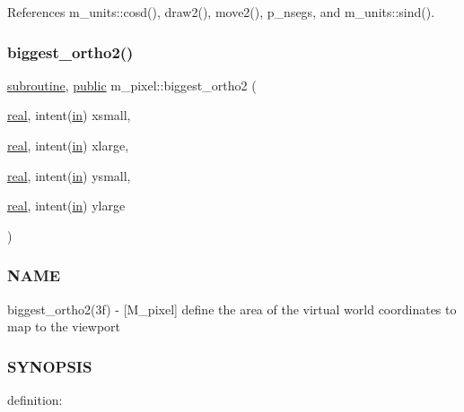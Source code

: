 References m\+\_\+units\+::cosd(), draw2(), move2(), p\+\_\+nsegs, and m\+\_\+units\+::sind().

\mbox{\label{namespacem__pixel_accc2eab6fbc7b453afa34e1e2c834223}} 
\subsubsection{\texorpdfstring{biggest\+\_\+ortho2()}{biggest\_ortho2()}}
{\footnotesize\ttfamily \hyperlink{M__stopwatch_83_8txt_acfbcff50169d691ff02d4a123ed70482}{subroutine}, \hyperlink{M__stopwatch_83_8txt_a2f74811300c361e53b430611a7d1769f}{public} m\+\_\+pixel\+::biggest\+\_\+ortho2 (\begin{DoxyParamCaption}\item[{\hyperlink{read__watch_83_8txt_abdb62bde002f38ef75f810d3a905a823}{real}, intent(\hyperlink{M__journal_83_8txt_afce72651d1eed785a2132bee863b2f38}{in})}]{xsmall,  }\item[{\hyperlink{read__watch_83_8txt_abdb62bde002f38ef75f810d3a905a823}{real}, intent(\hyperlink{M__journal_83_8txt_afce72651d1eed785a2132bee863b2f38}{in})}]{xlarge,  }\item[{\hyperlink{read__watch_83_8txt_abdb62bde002f38ef75f810d3a905a823}{real}, intent(\hyperlink{M__journal_83_8txt_afce72651d1eed785a2132bee863b2f38}{in})}]{ysmall,  }\item[{\hyperlink{read__watch_83_8txt_abdb62bde002f38ef75f810d3a905a823}{real}, intent(\hyperlink{M__journal_83_8txt_afce72651d1eed785a2132bee863b2f38}{in})}]{ylarge }\end{DoxyParamCaption})}



\subsubsection*{N\+A\+ME}

biggest\+\_\+ortho2(3f) -\/ \mbox{[}M\+\_\+pixel\mbox{]} define the area of the virtual world coordinates to map to the viewport 

\subsubsection*{S\+Y\+N\+O\+P\+S\+IS}

definition\+:

